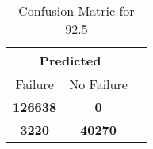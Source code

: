 \begin{table}[] 
\caption{Confusion Matric for 92.5} 
\label{Table: Prediction Accuracy-DMD92.5OnlySunEKF-resetReflectionperfectNoFailurePrediction-Reflection} 
\centering 
\begin{tabular} 
 {@{}ccc@{}} 
\toprule 
\multicolumn{2}{c}{\textbf{Predicted}}
 \\ \midrule 
\multicolumn{1}{|c|}{Failure} & 
\multicolumn{1}{c|}{No Failure}
 \\ \midrule 
\multicolumn{1}{|c|}{\color{green}\textbf{126638}} & 
\multicolumn{1}{c|}{\color{red}\textbf{0}}
 \\ \midrule 
\multicolumn{1}{|c|}{\color{red}\textbf{3220}} & 
\multicolumn{1}{c|}{\color{green}\textbf{40270}}
 \\ \bottomrule 
\end{tabular} 
\end{table} 
